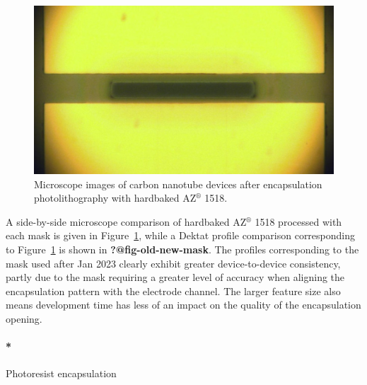 \documentclass[
  letterpaper,
  DIV=11,
  numbers=noendperiod]{scrartcl}
\let\oldparagraph\paragraph
\renewcommand{\paragraph}[1]{\oldparagraph{#1}\mbox{}}
\begin{document}
\begin{figure}
\begin{minipage}[t]{0.47\linewidth}
{{\includegraphics{figures/ch4/encapsulation_new.png}

}

}

\end{minipage}%

\caption{\label{fig-microscope-encapsulation}Microscope images of carbon
nanotube devices after encapsulation photolithography with hardbaked
AZ\(^\circledR\) 1518.}

\end{figure}

A side-by-side microscope comparison of hardbaked AZ\(^\circledR\) 1518
processed with each mask is given in
Figure~\ref{fig-microscope-encapsulation}, while a Dektat profile
comparison corresponding to Figure~\ref{fig-microscope-encapsulation} is
shown in \textbf{?@fig-old-new-mask}. The profiles corresponding to the
mask used after Jan 2023 clearly exhibit greater device-to-device
consistency, partly due to the mask requiring a greater level of
accuracy when aligning the encapsulation pattern with the electrode
channel. The larger feature size also means development time has less of
an impact on the quality of the encapsulation opening.

\hypertarget{photoresist-encapsulation}{%
\paragraph*{Photoresist encapsulation}\label{photoresist-encapsulation}}
\end{document}
